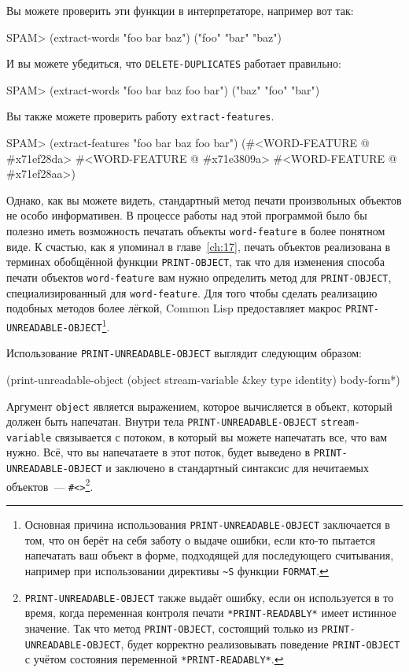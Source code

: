 Вы можете проверить эти функции в интерпретаторе, например вот так:

\begin{myverb}
SPAM> (extract-words "foo bar baz")
("foo" "bar" "baz")
\end{myverb}

И вы можете убедиться, что \lstinline{DELETE-DUPLICATES} работает правильно:

\begin{myverb}
SPAM> (extract-words "foo bar baz foo bar")
("baz" "foo" "bar")
\end{myverb}

Вы также можете проверить работу \lstinline{extract-features}.

\begin{myverb}
SPAM> (extract-features "foo bar baz foo bar")
(#<WORD-FEATURE @ #x71ef28da> #<WORD-FEATURE @ #x71e3809a>
 #<WORD-FEATURE @ #x71ef28aa>)
\end{myverb}

Однако, как вы можете видеть, стандартный метод печати произвольных объектов не особо
информативен.  В процессе работы над этой программой было бы полезно иметь возможность
печатать объекты \lstinline{word-feature} в более понятном виде.  К счастью, как я упоминал в
главе~\ref{ch:17}, печать объектов реализована в терминах обобщённой функции
\lstinline{PRINT-OBJECT}, так что для изменения способа печати объектов \lstinline{word-feature} вам
нужно определить метод для \lstinline{PRINT-OBJECT}, специализированный для
\lstinline{word-feature}.  Для того чтобы сделать реализацию подобных методов более лёгкой,
Common Lisp предоставляет макрос \lstinline{PRINT-UNREADABLE-OBJECT}\footnote{Основная причина
  использования \lstinline{PRINT-UNREADABLE-OBJECT} заключается в том, что он берёт на себя
  заботу о выдаче ошибки, если кто-то пытается напечатать ваш объект в форме, подходящей
  для последующего считывания, например при использовании директивы \lstinline{~S} функции
  \lstinline{FORMAT}.}.

Использование \lstinline{PRINT-UNREADABLE-OBJECT} выглядит следующим образом:

\begin{myverb}
(print-unreadable-object (object stream-variable &key type identity)
  body-form*)
\end{myverb}

Аргумент \lstinline{object} является выражением, которое вычисляется в объект, который должен
быть напечатан.  Внутри тела \lstinline{PRINT-UNREADABLE-OBJECT} \lstinline{stream-variable}
связывается с потоком, в который вы можете напечатать все, что вам нужно. Всё, что вы
на\-пе\-ча\-тае\-те в этот поток, будет выведено в \lstinline{PRINT-UNREADABLE-OBJECT} и заключено в
стандартный синтаксис для нечитаемых объектов~---
\lstinline!#<>!\footnote{\lstinline{PRINT-UNREADABLE-OBJECT} также выдаёт ошибку, если он
  используется в то время, когда переменная контроля печати \lstinline{*PRINT-READABLY*} имеет
  истинное значение.  Так что метод \lstinline{PRINT-OBJECT}, состоящий только из
  \lstinline{PRINT-UNREADABLE-OBJECT}, будет корректно реализовывать поведение
  \lstinline{PRINT-OBJECT} с учётом состояния переменной \lstinline{*PRINT-READABLY*}.}.

